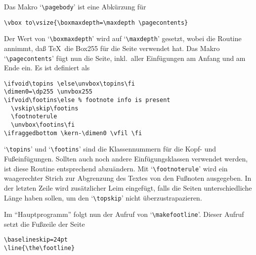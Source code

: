Das Makro 
`\verb|\pagebody|' ist eine Abk\"urzung f\"ur
\begin{verbatim}
\vbox to\vsize{\boxmaxdepth=\maxdepth \pagecontents}
\end{verbatim}
Der Wert von `\verb|\boxmaxdepth|' wird auf `\verb|\maxdepth|'
gesetzt, wobei die Routine annimmt, da\ss{} \TeX\ die 
Box255 f\"ur die Seite
verwendet hat. Das Makro `\verb|\pagecontents|' f\"ugt nun die Seite,
inkl.\ aller 
Einf\"ugungen am Anfang und am Ende ein. Es ist definiert als
\begin{verbatim}
\ifvoid\topins \else\unvbox\topins\fi
\dimen0=\dp255 \unvbox255
\ifvoid\footins\else % footnote info is present
  \vskip\skip\footins
  \footnoterule
  \unvbox\footins\fi
\ifraggedbottom \kern-\dimen0 \vfil \fi
\end{verbatim}
`\verb|\topins|' und `\verb|\footins|' sind die 
Klassennummern f\"ur die
Kopf- und Fu\ss{}einf\"ugungen. Sollten auch noch andere Einf\"ugungsklassen
verwendet werden, ist diese Routine entsprechend abzu\"andern. Mit
`\verb|\footnoterule|' wird ein waagerechter Strich zur Abgrenzung des
Textes von den 
Fu\ss{}noten ausgegeben. In der letzten Zeile wird
zus\"atzlicher 
Leim eingef\"ugt, falls die Seiten unterschiedliche L\"ange
haben sollen, um den
`\verb|\topskip|' nicht \"uberzustrapazieren.

Im 
``Hauptprogramm'' folgt nun der Aufruf von
`\verb|\makefootline|'.
Dieser Aufruf setzt die Fu\ss{}zeile der Seite
\begin{verbatim}
\baselineskip=24pt
\line{\the\footline}
\end{verbatim}

